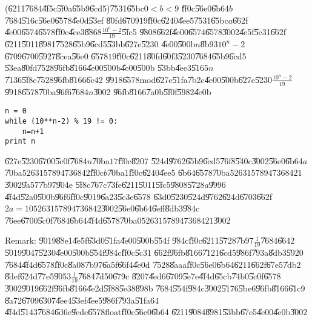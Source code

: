 \documentclass{article}
\begin{document}
(\U{6211}\U{7684}\U{4f5c}\U{5f0a}\U{65b9}\U{6cd5})\U{7531}\U{65bc}$0<b<9$%
\U{ff0c}\U{56e0}\U{6b64}$b$\U{7684}\U{516c}\U{56e0}\U{6578}\U{4e0d}\U{53ef}%
\U{80fd}\U{6709}$19$\U{ff0c}\U{6240}\U{4ee5}\U{7531}\U{65bc}$a$\U{662f}%
\U{4e00}\U{6574}\U{6578}\U{ff0c}\U{4ee3}\U{8868}$\frac{10^{n}-2}{19}$\U{5fc5}%
\U{9808}\U{662f}\U{4e00}\U{6574}\U{6578}\U{3002}\U{4e5f}\U{5c31}\U{662f}%
\U{6211}\U{5011}\U{8981}\U{7528}\U{65b9}\U{6cd5}\U{53bb}\U{627e}\U{5230}%
\U{4e00}\U{500b}$n$\U{8b93}$10^{n}-2$\U{6709}\U{6700}\U{5927}\U{8cea}\U{56e0}%
\U{6578}$19$\U{ff0c}\U{6211}\U{80fd}\U{60f3}\U{5230}\U{7684}\U{65b9}\U{6cd5}%
\U{53ea}\U{80fd}\U{7528}\U{96fb}\U{8166}\U{4e00}\U{500b}\U{4e00}\U{500b}%
\U{53bb}\U{4ee3}\U{5165}$n$\U{7136}\U{5f8c}\U{7528}\U{96fb}\U{8166}\U{6c42}%
\U{9918}\U{6578}mod\U{627e}\U{51fa}\U{7b2c}\U{4e00}\U{500b}\U{627e}\U{5230}$%
\frac{10^{n}-2}{19}$\U{9918}\U{6578}\U{70ba}\U{96f6}\U{7684}$n$\U{3002}%
\U{96fb}\U{8166}\U{7a0b}\U{5f0f}\U{5982}\U{4e0b}
\begin{verbatim}
n = 0
while (10**n-2) % 19 != 0:
    n=n+1
print n
\end{verbatim}

\U{627e}\U{5230}\U{6700}\U{5c0f}\U{7684}$n$\U{70ba}$17$\U{ff0c}\U{8207}%
\U{524d}\U{9762}\U{65b9}\U{6cd5}\U{76f8}\U{540c}\U{3002}\U{56e0}\U{6b64}$a$%
\U{70ba}$5263157894736842$\U{ff0c}$b$\U{70ba}$1$\U{ff0c}\U{6240}\U{4ee5}%
\U{6b64}\U{6578}\U{70ba}$52631578947368421$\U{3002}\U{9a57}\U{7b97}\U{904e}%
\U{5f8c}\U{767c}\U{73fe}\U{6211}\U{5011}\U{5fc5}\U{9808}\U{5728}$a$\U{9996}%
\U{4f4d}\U{52a0}\U{500b}\U{96f6}\U{ff0c}\U{9019}\U{6a23}\U{5c3e}\U{6578}%
\U{63d0}\U{5230}\U{524d}\U{9762}\U{624d}\U{6703}\U{662f}$%
2a=105263157894736842$\U{3002}\U{56e0}\U{6b64}\U{6eff}\U{8db3}\U{984c}%
\U{76ee}\U{6700}\U{5c0f}\U{7684}\U{6b64}\U{4f4d}\U{6578}\U{70ba}$%
052631578947368421$\U{3002}

\bigskip

Remark: \U{9019}\U{88e1}\U{4e5f}\U{63d0}\U{51fa}\U{4e00}\U{500b}\U{554f}%
\U{984c}\U{ff0c}\U{6211}\U{5728}\U{7b97}$\frac{1}{19}$\U{7684}\U{6642}%
\U{5019}\U{9047}\U{5230}\U{4e00}\U{500b}\U{554f}\U{984c}\U{ff0c}\U{5c31}%
\U{662f}\U{96fb}\U{8166}\U{7121}\U{6cd5}\U{986f}\U{793a}\U{8db3}\U{5920}%
\U{7684}\U{4f4d}\U{6578}\U{ff0c}\U{8a08}\U{7b97}\U{6a5f}\U{66f4}\U{4e0d}%
\U{7528}\U{8aaa}\U{ff0c}\U{56e0}\U{6b64}\U{6211}\U{662f}\U{67e5}\U{7db2}%
\U{8def}\U{624d}\U{77e5}\U{9053}$\frac{1}{19}$\U{7684}\U{7d50}\U{679c}%
\U{8207}\U{4ed6}\U{6709}\U{5e7e}\U{4f4d}\U{65cb}\U{74b0}\U{5c0f}\U{6578}%
\U{3002}\U{9019}\U{662f}\U{96fb}\U{8166}\U{4e2d}\U{5f88}\U{5e38}\U{898b}%
\U{7684}\U{554f}\U{984c}\U{3002}\U{5176}\U{5be6}\U{96fb}\U{8166}\U{61c9}%
\U{8a72}\U{6709}\U{6307}\U{4ee4}\U{53ef}\U{4ee5}\U{986f}\U{793a}\U{51fa}$64$%
\U{4f4d}\U{5143}\U{7684}\U{6d6e}\U{9ede}\U{6578}float\U{ff0c}\U{56e0}\U{6b64}%
\U{6211}\U{9084}\U{8981}\U{53bb}\U{67e5}\U{4e00}\U{4e0b}\U{3002}
\end{document}

